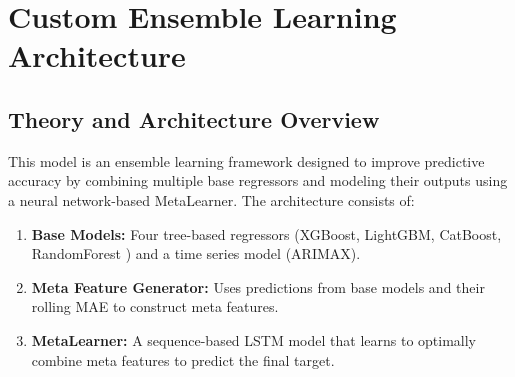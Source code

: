 
\section{Custom Ensemble Learning Architecture}

\subsection{Theory and Architecture Overview}

This model is an ensemble learning framework designed to improve predictive accuracy by combining multiple base regressors and modeling their outputs using a neural network-based MetaLearner. The architecture consists of:

\begin{enumerate}
    \item \textbf{Base Models:} Four tree-based regressors (XGBoost, LightGBM, CatBoost, RandomForest \cite{breiman2001random}) and a time series model (ARIMAX).
    \item \textbf{Meta Feature Generator:} Uses predictions from base models and their rolling MAE to construct meta features.
    \item \textbf{MetaLearner:} A sequence-based LSTM model that learns to optimally combine meta features to predict the final target.
\end{enumerate}

